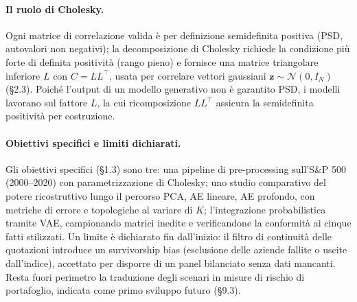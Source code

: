 \paragraph{Il ruolo di Cholesky.} Ogni matrice di correlazione valida è per definizione semidefinita positiva (PSD, autovalori non negativi); la decomposizione di Cholesky richiede la condizione più forte di definita positività (rango pieno) e fornisce una matrice triangolare inferiore $L$ con $C = L L^{\top}$, usata per correlare vettori gaussiani $\mathbf{z} \sim \mathcal{N}(0, I_N)$ (\S2.3). Poiché l'output di un modello generativo non è garantito PSD, i modelli lavorano sul fattore $L$, la cui ricomposizione $L L^{\top}$ assicura la semidefinita positività per costruzione.

\paragraph{Obiettivi specifici e limiti dichiarati.} Gli obiettivi specifici (\S1.3) sono tre: una pipeline di pre-processing sull'S\&P 500 (2000--2020) con parametrizzazione di Cholesky; uno studio comparativo del potere ricostruttivo lungo il percorso PCA, AE lineare, AE profondo, con metriche di errore e topologiche al variare di $K$; l'integrazione probabilistica tramite VAE, campionando matrici inedite e verificandone la conformità ai cinque fatti stilizzati. Un limite è dichiarato fin dall'inizio: il filtro di continuità delle quotazioni introduce un survivorship bias (esclusione delle aziende fallite o uscite dall'indice), accettato per disporre di un panel bilanciato senza dati mancanti. Resta fuori perimetro la traduzione degli scenari in misure di rischio di portafoglio, indicata come primo sviluppo futuro (\S9.3).
